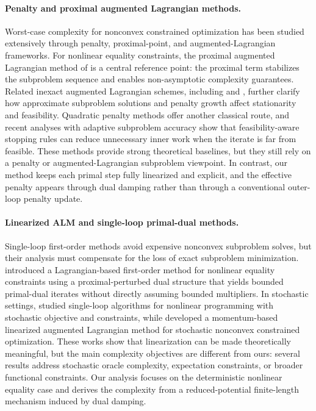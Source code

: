 \paragraph{Penalty and proximal augmented Lagrangian methods.}
Worst-case complexity for nonconvex constrained optimization has been studied
extensively through penalty, proximal-point, and augmented-Lagrangian
frameworks.  For nonlinear equality constraints, the proximal augmented
Lagrangian method of \citet{xie2021proximal} is a central reference point:
the proximal term stabilizes the subproblem sequence and enables
non-asymptotic complexity guarantees.  Related inexact augmented Lagrangian
schemes, including \citet{li2021rate} and
\citet{sahinInexactAugmentedLagrangian2019}, further clarify how approximate
subproblem solutions and penalty growth affect stationarity and feasibility.
Quadratic penalty methods offer another classical route, and recent analyses
with adaptive subproblem accuracy show that feasibility-aware stopping rules
can reduce unnecessary inner work when the iterate is far from feasible.
These methods provide strong theoretical baselines, but they still rely on a
penalty or augmented-Lagrangian subproblem viewpoint.  In contrast, our method
keeps each primal step fully linearized and explicit, and the effective
penalty appears through dual damping rather than through a conventional
outer-loop penalty update.

\paragraph{Linearized ALM and single-loop primal-dual methods.}
Single-loop first-order methods avoid expensive nonconvex subproblem solves,
but their analysis must compensate for the loss of exact subproblem
minimization.  \citet{kimNewLagrangianbasedFirstorder2023} introduced a
Lagrangian-based first-order method for nonlinear equality constraints using a
proximal-perturbed dual structure that yields bounded primal-dual iterates
without directly assuming bounded multipliers.  In stochastic settings,
\citet{alacaoglu2024complexity} studied single-loop algorithms for nonlinear
programming with stochastic objective and constraints, while
\citet{shi2025momentum} developed a momentum-based linearized augmented
Lagrangian method for stochastic nonconvex constrained optimization.  These
works show that linearization can be made theoretically meaningful, but the
main complexity objectives are different from ours: several results address
stochastic oracle complexity, expectation constraints, or broader functional
constraints.  Our analysis focuses on the deterministic nonlinear equality
case and derives the complexity from a reduced-potential finite-length
mechanism induced by dual damping.

